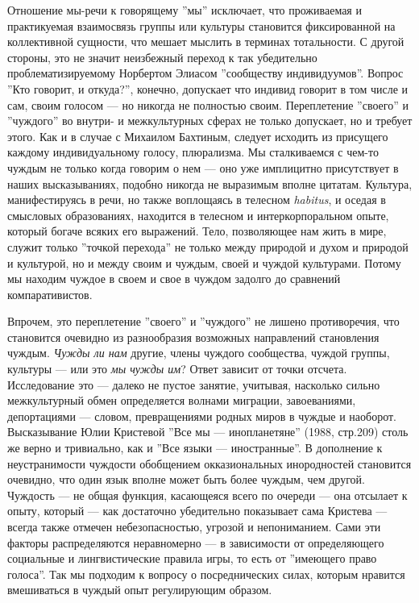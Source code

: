\documentclass[12pt]{book}
\begin{document}
Отношение мы-речи к говорящему ''мы'' исключает, что проживаемая и практикуемая взаимосвязь группы или культуры становится фиксированной на коллективной сущности, что мешает мыслить в терминах тотальности. С другой стороны, это не значит неизбежный переход к так убедительно проблематизируемому Норбертом Элиасом ''сообществу индивидуумов''. Вопрос ''Кто говорит, и откуда?'', конечно, допускает что индивид говорит в том числе и сам, своим голосом --- но никогда не полностью своим. Переплетение ''своего'' и ''чуждого'' во внутри- и межкультурных сферах не только допускает, но и требует этого. Как и в случае с Михаилом Бахтиным, следует исходить из присущего каждому индивидуальному голосу, плюрализма. Мы сталкиваемся с чем-то чуждым не только когда говорим о нем --- оно уже имплицитно присутствует в наших высказываниях, подобно никогда не выразимым вполне цитатам. Культура, манифестируясь в речи, но также воплощаясь в телесном \textit{habitus}, и оседая в смысловых образованиях, находится в телесном и интеркорпоральном опыте, который богаче всяких его выражений. Тело, позволяющее нам жить в мире, служит только ''точкой перехода'' не только между природой и духом и природой и культурой, но и между своим и чуждым, своей и чуждой культурами. Потому мы находим чуждое в своем и свое в чуждом задолго до сравнений компаративистов.

Впрочем, это переплетение ''своего'' и ''чуждого'' не лишено противоречия, что становится очевидно из разнообразия возможных направлений становления чуждым. \textit{Чужды ли нам} другие, члены чуждого сообщества, чуждой группы, культуры --- или это \textit{мы чужды им}? Ответ зависит от точки отсчета. Исследование это --- далеко не пустое занятие, учитывая, насколько сильно межкультурный обмен определяется волнами миграции, завоеваниями, депортациями --- словом, превращениями родных миров в чуждые и наоборот. Высказывание Юлии Кристевой ''Все мы --- инопланетяне'' (1988, стр.209) столь же верно и тривиально, как и ''Все языки --- иностранные''. В дополнение к неустранимости чуждости обобщением окказиональных инородностей становится очевидно, что один язык вполне может быть более чуждым, чем другой. Чуждость --- не общая функция, касающеяся всего по очереди --- она отсылает к опыту, который --- как достаточно убедительно показывает сама Кристева --- всегда также отмечен небезопасностью, угрозой и непониманием. Сами эти факторы распределяются неравномерно --- в зависимости от определяющего социальные и лингвистические правила игры, то есть от ''имеющего право голоса''. Так мы подходим к вопросу о посреднических силах, которым нравится вмешиваться в чуждый опыт регулирующим образом.
\end{document}
